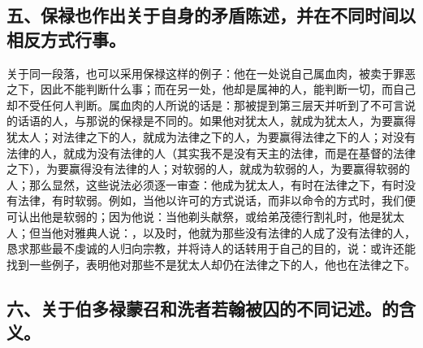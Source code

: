
\subsection{五、保禄也作出关于自身的矛盾陈述，并在不同时间以相反方式行事。}

关于同一段落，也可以采用保禄这样的例子：他在一处说自己属血肉，被卖于罪恶之下，因此不能判断什么事；而在另一处，他却是属神的人，能判断一切，而自己却不受任何人判断。属血肉的人所说的话是：那被提到第三层天并听到了不可言说的话语的人，与那说的保禄是不同的。如果他对犹太人，就成为犹太人，为要赢得犹太人；对法律之下的人，就成为法律之下的人，为要赢得法律之下的人；对没有法律的人，就成为没有法律的人（其实我不是没有天主的法律，而是在基督的法律之下），为要赢得没有法律的人；对软弱的人，就成为软弱的人，为要赢得软弱的人；那么显然，这些说法必须逐一审查：他成为犹太人，有时在法律之下，有时没有法律，有时软弱。例如，当他以许可的方式说话，而非以命令的方式时，我们便可认出他是软弱的；因为他说：当他剃头献祭，或给弟茂德行割礼时，他是犹太人；但当他对雅典人说：，以及时，他就为那些没有法律的人成了没有法律的人，恳求那些最不虔诚的人归向宗教，并将诗人的话转用于自己的目的，说：或许还能找到一些例子，表明他对那些不是犹太人却仍在法律之下的人，他也在法律之下。\par


\subsection{六、关于伯多禄蒙召和洗者若翰被囚的不同记述。的含义。}

